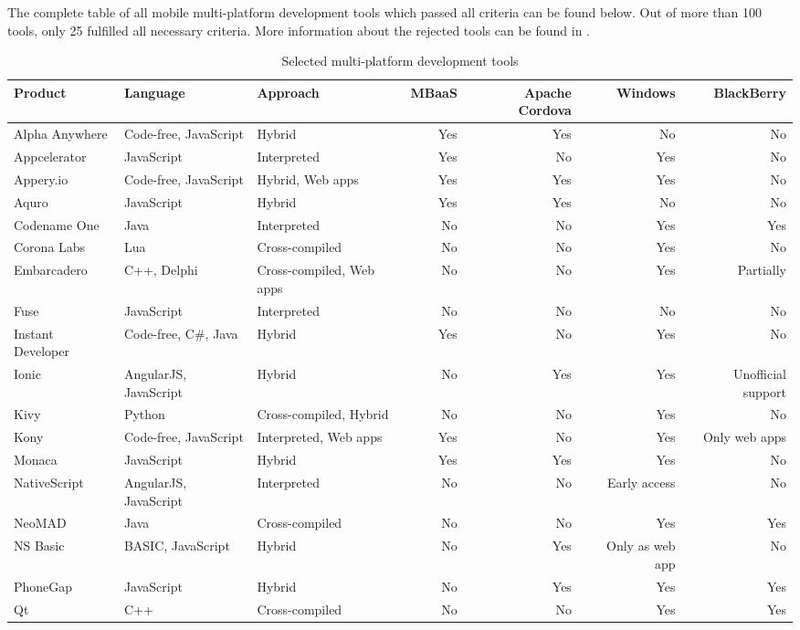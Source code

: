 \documentclass[english,master,public,dept460,male,cpdeclaration,oneside]{diploma}
\begin{document}
The complete table of all mobile multi-platform development tools which passed all criteria can be found below. Out of more than 100 tools, only 25 fulfilled all necessary criteria. More information about the rejected tools can be found in \cite{aarhus}. 

\begin{table}
	\centering
	\caption{Selected multi-platform development tools}
	\begin{tabular}{l l l r r r r}
		\toprule
		Product & Language & Approach & MBaaS & Apache Cordova & Windows & BlackBerry \\
		\midrule
		Alpha Anywhere & Code-free, JavaScript & Hybrid & Yes & Yes & No & No \\
		Appcelerator & JavaScript & Interpreted & Yes & No & Yes & No \\
		Appery.io & Code-free, JavaScript & Hybrid, Web apps & Yes & Yes & Yes & No \\
		Aquro & JavaScript & Hybrid & Yes & Yes & No & No \\
		Codename One & Java & Interpreted & No & No & Yes & Yes \\
		Corona Labs & Lua & Cross-compiled & No & No & Yes & No \\
		Embarcadero & C++, Delphi & Cross-compiled, Web apps & No & No & Yes & Partially \\
		Fuse & JavaScript & Interpreted & No & No & No & No \\
		Instant Developer & Code-free, C\#, Java & Hybrid & Yes & No & Yes & No \\
		Ionic & AngularJS, JavaScript & Hybrid & No & Yes & Yes & Unofficial support \\
		Kivy & Python & Cross-compiled, Hybrid & No & No & Yes & No \\
		Kony & Code-free, JavaScript & Interpreted, Web apps & Yes & No & Yes & Only web apps \\
		Monaca & JavaScript & Hybrid & Yes & Yes & Yes & No \\
		NativeScript & AngularJS, JavaScript & Interpreted & No & No & Early access & No \\
		NeoMAD & Java & Cross-compiled & No & No & Yes & Yes \\
		NS Basic & BASIC, JavaScript & Hybrid & No & Yes & Only as web app & No \\
		PhoneGap & JavaScript & Hybrid & No & Yes & Yes & Yes \\
		Qt & C++ & Cross-compiled & No & No & Yes & Yes \\

\end{tabular}
\end{table}
\end{document}

